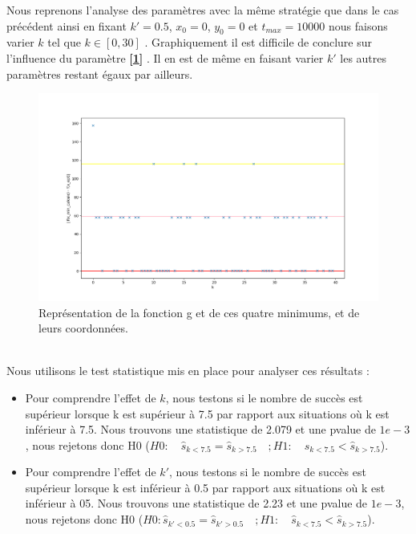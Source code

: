\documentclass[12pt]{article}
\begin{document}
\begin{minipage}{0.5\textwidth}
Nous reprenons l'analyse des paramètres avec la même stratégie que dans le cas précédent ainsi en fixant $k'=0.5$, $x_0=0$, $y_0=0$ et $t_{max}=10000$ nous faisons varier $k$ tel que $k\in [0,30]$ . Graphiquement il est difficile de conclure sur l'influence du paramètre \textbf{[\ref{Q2K}]}
. Il en est de même en faisant varier $k'$ les autres paramètres restant égaux par ailleurs.
\end{minipage} \hfill
\begin{minipage}{0.45\textwidth}
\begin{figure}[H]
\includegraphics[width=1\textwidth]{Q2K.png}
\caption{Représentation de la fonction g et de ces quatre minimums, et de leurs coordonnées.}
\label{Q2K}
\end{figure}
\end{minipage}
\\
Nous utilisons le test statistique mis en place pour analyser ces résultats :
\begin{itemize}
    \item Pour comprendre l'effet de $k$, nous testons si le nombre de succès est supérieur lorsque k est supérieur à 7.5 par rapport aux situations où k est inférieur à 7.5. Nous trouvons une statistique de 2.079 et une pvalue de  $1e-3$, nous rejetons donc H0 ($H0 : \quad \hat{s}_{k<7.5} =\hat{s}_{k>7.5} \quad;  H1 :\quad \hat{s}_{k<7.5} < \hat{s}_{k>7.5} $).
    \item Pour comprendre l'effet de $k'$, nous testons si le nombre de succès est supérieur lorsque k est inférieur à 0.5 par rapport aux situations où k est inférieur  à 05. Nous trouvons une statistique de 2.23 et une pvalue de  $1e-3$, nous rejetons donc H0 ($H0 : \hat{s}_{k'<0.5} =\hat{s}_{k'>0.5}  \quad;  H1 :\quad \hat{s}_{k<7.5} < \hat{s}_{k>7.5} $).
\end{itemize}
\end{document}
